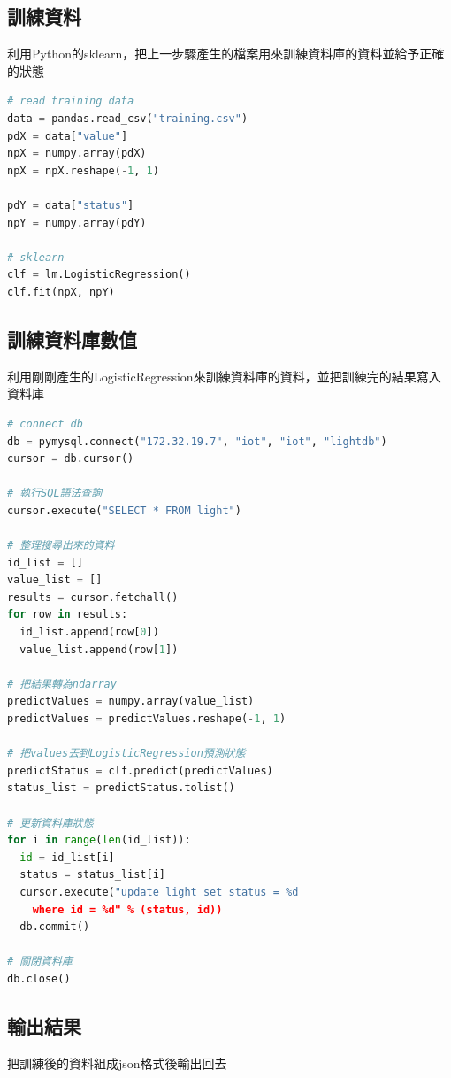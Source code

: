 \documentclass[12pt,a4paper]{article}
\begin{document}
{{\newpage
\subsection{訓練資料}
利用Python的sklearn，把上一步驟產生的檔案用來訓練資料庫的資料並給予正確的狀態
\begin{shaded}
\begin{lstlisting}[language=Python]
# read training data
data = pandas.read_csv("training.csv")
pdX = data["value"]
npX = numpy.array(pdX)
npX = npX.reshape(-1, 1)

pdY = data["status"]
npY = numpy.array(pdY)

# sklearn
clf = lm.LogisticRegression()
clf.fit(npX, npY)
\end{lstlisting}
\end{shaded}

\subsection{訓練資料庫數值}
利用剛剛產生的LogisticRegression來訓練資料庫的資料，並把訓練完的結果寫入資料庫
\begin{shaded}
\begin{lstlisting}[language=Python]
# connect db
db = pymysql.connect("172.32.19.7", "iot", "iot", "lightdb")
cursor = db.cursor()

# 執行SQL語法查詢
cursor.execute("SELECT * FROM light")

# 整理搜尋出來的資料
id_list = []
value_list = []
results = cursor.fetchall()
for row in results:
  id_list.append(row[0])
  value_list.append(row[1])

# 把結果轉為ndarray
predictValues = numpy.array(value_list)
predictValues = predictValues.reshape(-1, 1)

# 把values丟到LogisticRegression預測狀態
predictStatus = clf.predict(predictValues)
status_list = predictStatus.tolist()

# 更新資料庫狀態
for i in range(len(id_list)):
  id = id_list[i]
  status = status_list[i]
  cursor.execute("update light set status = %d 
  	where id = %d" % (status, id))
  db.commit()

# 關閉資料庫
db.close()
\end{lstlisting}
\end{shaded}

\subsection{輸出結果}
把訓練後的資料組成json格式後輸出回去

}}
\end{document}
